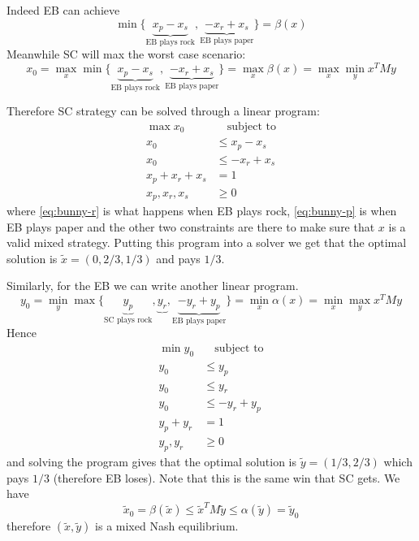 \documentclass[12pt]{extarticle}
\begin{document}
Indeed EB can achieve
\begin{equation}
	\min \{ \underbrace{x_p - x_s}_{\text{EB plays rock}},
	\underbrace{ -x_r + x_s}_{\text{EB plays paper}}\} = \beta(x)
\end{equation}
Meanwhile SC will max the worst case scenario:
\begin{equation}
	x_0 = \max_{x} \min \{ \underbrace{x_p - x_s}_{\text{EB plays rock}} ,
	\underbrace{ -x_r + x_s}_{\text{EB plays paper}}\}
	= \max_x \beta(x)
	= \max_x \min_y x^T M y
\end{equation}

Therefore SC strategy can be solved through a linear program:
\begin{align}
	\max             x_0 & \quad \text{subject to}                    \\
	x_0                  & \leq x_p - x_s          \label{eq:bunny-r} \\
	x_0                  & \leq -x_r + x_s         \label{eq:bunny-p} \\
	x_p + x_r + x_s      & = 1                                        \\
	x_p, x_r, x_s        & \geq 0
\end{align}
where \cref{eq:bunny-r} is what happens when EB plays rock, \cref{eq:bunny-p} is when EB plays paper
and the other two constraints are there to make sure that $x$ is a valid mixed strategy.
Putting this program into a solver we get that the optimal solution is $\tilde x = (0, 2/3, 1/3)$
and pays $1/3$.

Similarly, for the EB we can write another linear program.
\begin{equation}
	y_0 = \min_{y} \max \{ \underbrace{y_p}_{\text{SC plays rock}} ,
	\underbrace{y_r},
	\underbrace{ -y_r + y_p}_{\text{EB plays paper}}\}
	= \min_x \alpha(x)
	= \min_x \max_y x^T M y
\end{equation}
Hence
\begin{align}
	\min y_0  & \quad \text{subject to} \\
	y_0       & \leq y_p                \\
	y_0       & \leq y_r                \\
	y_0       & \leq -y_r + y_p         \\
	y_p + y_r & = 1                     \\
	y_p, y_r  & \geq 0
\end{align}
and solving the program gives that the optimal solution is $\tilde y = (1/3, 2/3)$ which pays $1/3$
(therefore EB loses).
Note that this is the same win that SC gets.
We have
\begin{equation}
	\tilde x_0 = \beta(\tilde x) \leq \tilde x^T M \tilde y \leq \alpha(\tilde y) = \tilde y_0
\end{equation}
therefore $(\tilde x, \tilde y)$ is a mixed Nash equilibrium.
\end{document}

